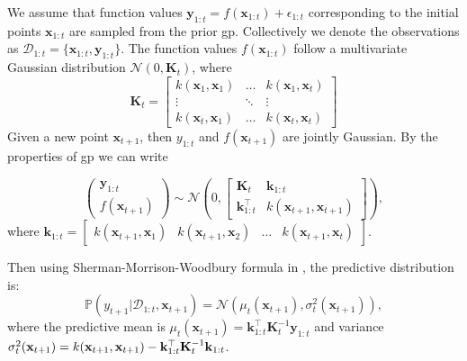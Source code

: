 
We assume that function values ${\mathbf{y}}_{1:t} = f(\mathbf{x}_{1:t})+\epsilon_{1:t}$ corresponding to the initial points $\mathbf{x}_{1:t}$ are sampled
from the prior \ac{gp}. Collectively we denote the observations as $\mathcal{D}_{1:t} = \{\mathbf{x}_{1:t}, \mathbf{y}_{1:t}\}$. The function
values $f(\mathbf{x}_{1:t})$ follow a multivariate Gaussian distribution $\mathcal{N}(0, \mathbf{K}_t)$, where
\[ \mathbf{K}_t = \begin{bmatrix} 
    k(\mathbf{x}_1, \mathbf{x}_1) & \dots  & k(\mathbf{x}_1, \mathbf{x}_t)\\
    \vdots & \ddots & \vdots\\
    k(\mathbf{x}_t, \mathbf{x}_1) & \dots  & k(\mathbf{x}_t, \mathbf{x}_t)
    \end{bmatrix}
\]
Given a new point $\mathbf{x}_{t+1}$, then $y_{1:t}$ and $f(\mathbf{x}_{t+1})$ are jointly Gaussian. By the properties of \ac{gp} we can write

\[
\begin{pmatrix}
\mathbf{y}_{1:t} \\
f(\mathbf{x}_{t+1})
\end{pmatrix} \sim \mathcal{N}\left(0, \begin{bmatrix}
\mathbf{K}_t & \mathbf{k}_{1:t} \\
\mathbf{k}_{1:t}^\top & k(\mathbf{x}_{t+1}, \mathbf{x}_{t+1})
\end{bmatrix} \right), 
\]
where $\mathbf{k}_{1:t} = \begin{bmatrix}
k(\mathbf{x}_{t+1}, \mathbf{x}_1) & k(\mathbf{x}_{t+1}, \mathbf{x}_2) & \dots & k(\mathbf{x}_{t+1}, \mathbf{x}_t)
\end{bmatrix}$.

Then using Sherman-Morrison-Woodbury formula in \citet{rasmussen2006gaussian}, the predictive distribution is:
\[ \mathbb{P}(y_{t+1} \lvert \mathcal{D}_{1:t}, \mathbf{x}_{t+1})= \mathcal{N}(\mu_t(\mathbf{x}_{t+1}), \sigma_t^2(\mathbf{x}_{t+1})), 
\]
where the predictive mean is $\mu_t(\mathbf{x}_{t+1}) = \mathbf{k}_{1:t}^\top \mathbf{K}_t^{-1} \mathbf{y}_{1:t}$ and variance $\sigma_{t}^{2}({\bf x}_{t+1}) = k({\bf x}_{t+1},{\bf x}_{t+1})-{\bf k}_{1:t}^{\top} \mathbf{K}_t^{-1}{\bf k}_{1:t}$. 

